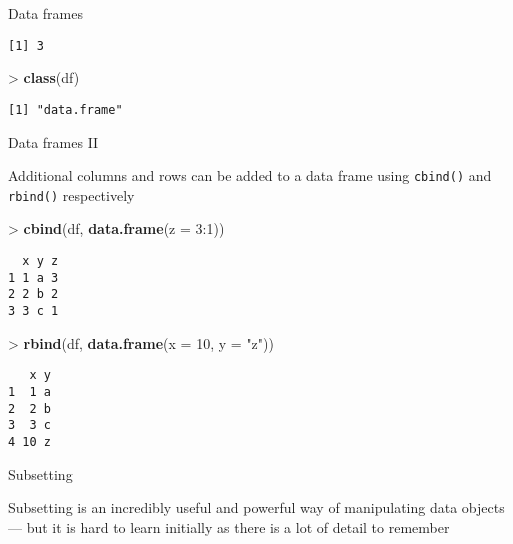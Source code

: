 \documentclass[10pt,ignorenonframetext,compress, aspectratio=169]{beamer}
\newenvironment{Shaded}{\begin{snugshade}}{\end{snugshade}}
\newcommand{\KeywordTok}[1]{\textcolor[rgb]{0.13,0.29,0.53}{\textbf{{#1}}}}
\newcommand{\DataTypeTok}[1]{\textcolor[rgb]{0.13,0.29,0.53}{{#1}}}
\newcommand{\DecValTok}[1]{\textcolor[rgb]{0.00,0.00,0.81}{{#1}}}
\newcommand{\StringTok}[1]{\textcolor[rgb]{0.31,0.60,0.02}{{#1}}}
\newcommand{\NormalTok}[1]{{#1}}
\begin{document}
\begin{frame}[fragile]{Data frames}
\begin{verbatim}
[1] 3
\end{verbatim}

\begin{Shaded}
\begin{Highlighting}[]
\NormalTok{>}\StringTok{ }\KeywordTok{class}\NormalTok{(df)}
\end{Highlighting}
\end{Shaded}

\begin{verbatim}
[1] "data.frame"
\end{verbatim}

\end{frame}

\begin{frame}[fragile]{Data frames II}

Additional columns and rows can be added to a data frame using
\texttt{cbind()} and \texttt{rbind()} respectively

\begin{Shaded}
\begin{Highlighting}[]
\NormalTok{>}\StringTok{ }\KeywordTok{cbind}\NormalTok{(df, }\KeywordTok{data.frame}\NormalTok{(}\DataTypeTok{z =} \DecValTok{3}\NormalTok{:}\DecValTok{1}\NormalTok{))}
\end{Highlighting}
\end{Shaded}

\begin{verbatim}
  x y z
1 1 a 3
2 2 b 2
3 3 c 1
\end{verbatim}

\begin{Shaded}
\begin{Highlighting}[]
\NormalTok{>}\StringTok{ }\KeywordTok{rbind}\NormalTok{(df, }\KeywordTok{data.frame}\NormalTok{(}\DataTypeTok{x =} \DecValTok{10}\NormalTok{, }\DataTypeTok{y =} \StringTok{"z"}\NormalTok{))}
\end{Highlighting}
\end{Shaded}

\begin{verbatim}
   x y
1  1 a
2  2 b
3  3 c
4 10 z
\end{verbatim}

\end{frame}

\begin{frame}{Subsetting}

Subsetting is an incredibly useful and powerful way of manipulating data
objects --- but it is hard to learn initially as there is a lot of
detail to remember

\end{frame}
\end{document}
